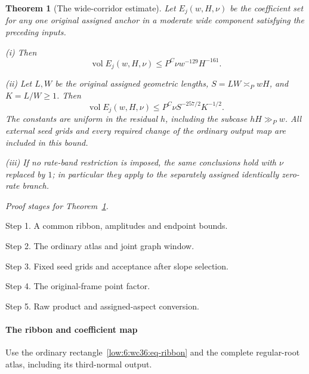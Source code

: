 \documentclass[11pt]{amsart}
\newtheorem{theorem}{Theorem}[section]
\theoremstyle{definition}
\theoremstyle{remark}
\DeclareMathOperator{\vol}{vol}
\numberwithin{equation}{section}
\begin{document}
\begin{theorem}[The wide-corridor estimate]\label{low:6:wc36:thm-main}
Let $E_j(w,H,\nu)$ be the coefficient set for any one original assigned anchor in a moderate wide component satisfying the preceding inputs.

\noindent\textup{(i)} Then
\begin{equation}\label{low:6:wc36:eq-rawfinal}
 \vol E_j(w,H,\nu)\le P^C\nu w^{-129}H^{-161}.
\end{equation}

\noindent\textup{(ii)} Let $L,W$ be the original assigned geometric lengths, $S=LW\asymp_PwH$, and $K=L/W\ge1$. Then
\begin{equation}\label{low:6:wc36:eq-final}
 \vol E_j(w,H,\nu)\le P^C\nu S^{-257/2}K^{-1/2}.
\end{equation}
The constants are uniform in the residual $h$, including the subcase $hH\gg_Pw$. All external seed grids and every required change of the ordinary output map are included in this bound.

\noindent\textup{(iii)} If no rate-band restriction is imposed, the same conclusions hold with $\nu$ replaced by $1$; in particular they apply to the separately assigned identically zero-rate branch.
\end{theorem}

\par\smallskip
\noindent\textit{Proof stages for Theorem~\ref{low:6:wc36:thm-main}.}\par\nobreak
\noindent\textup{Step 1.} A common ribbon, amplitudes and endpoint bounds.\par\nobreak
\noindent\textup{Step 2.} The ordinary atlas and joint graph window.\par\nobreak
\noindent\textup{Step 3.} Fixed seed grids and acceptance after slope selection.\par\nobreak
\noindent\textup{Step 4.} The original-frame point factor.\par\nobreak
\noindent\textup{Step 5.} Raw product and assigned-aspect conversion.\par\nobreak
\smallskip

\paragraph{The ribbon and coefficient map}

Use the ordinary rectangle~\eqref{low:6:wc36:eq-ribbon} and the complete regular-root atlas, including its third-normal output.
\end{document}
